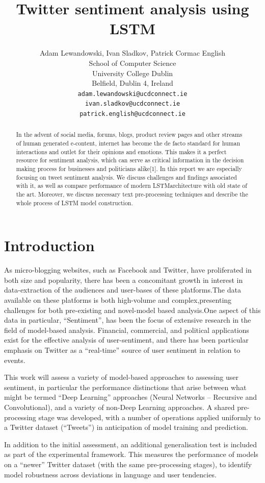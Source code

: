 \documentclass{article}
\title{Twitter sentiment analysis using LSTM}
\author{%
  Adam Lewandowski, Ivan Sladkov, Patrick Cormac English  \\
  School of Computer Science\\
  University College Dublin\\
  Belfield, Dublin 4, Ireland \\
  \texttt{adam.lewandowski@ucdconnect.ie} \\
  \texttt{ivan.sladkov@ucdconnect.ie} \\
  \texttt{patrick.english@ucdconnect.ie} \\
}
\begin{document}
\maketitle

\begin{abstract}
  In the advent of social media, forums, blogs, product review pages and other
  streams of human generated e-content, internet has become the de facto
  standard for human interactions and outlet for their opinions and emotions.
  This makes it a perfect resource for sentiment analysis, which can serve as
  critical information in the decision making process for businesses and
  politicians alike[1]. In this report we are especially focusing on tweet
  sentiment analysis. We discuss challenges and findings associated with it, as
  well as compare performance of modern LSTMarchitecture with old state of the
  art. Moreover, we discuss necessary text pre-processing techniques and
  describe the whole process of LSTM model construction.
\end{abstract}

\section{Introduction}

As micro-blogging websites, such as Facebook and Twitter, have proliferated in
both size and popularity, there has been a concomitant growth in interest in
data-extraction of the audiences and user-bases of these platforms.The data
available on these platforms is both high-volume and complex,presenting
challenges for both pre-existing and novel-model based analysis.One aspect of
this data in particular, “Sentiment”, has been the focus of extensive research
in the field of model-based analysis. Financial, commercial, and political
applications exist for the effective analysis of user-sentiment, and there has
been particular emphasis on Twitter as a “real-time” source of user sentiment in relation to events.
\par
This work will assess a variety of model-based approaches to assessing user
sentiment, in particular the performance distinctions that arise between what
might be termed “Deep Learning” approaches (Neural Networks – Recursive and
Convolutional), and a variety of non-Deep Learning approaches. A shared
pre-processing stage was developed, with a number of operations applied
uniformly to a Twitter dataset (“Tweets”) in anticipation of model training and prediction.
\par
In addition to the initial assessment, an additional generalisation test is
included as part of the experimental framework. This measures the performance of
models on a “newer” Twitter dataset (with the same pre-processing stages), to
identify model robustness across deviations in language and user tendencies.
\end{document}

